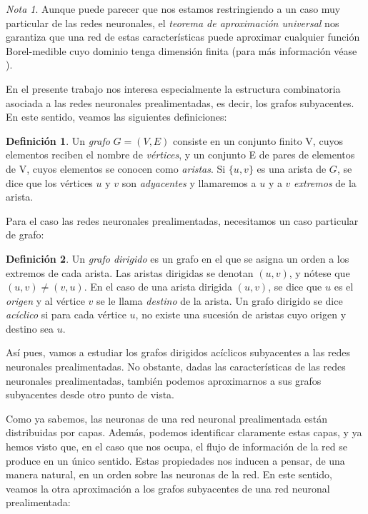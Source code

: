 \documentclass[12pt, a4paper, twoside]{book}
\numberwithin{equation}{section}
\theoremstyle{definition}
\newtheorem{defi}{Definición}[section]
\theoremstyle{remark}
\newtheorem*{remark}{Nota}
\theoremstyle{plain}
\begin{document}
	\begin{remark}
	Aunque puede parecer que nos 
	estamos restringiendo a un caso muy particular de las redes 
	neuronales, el \emph{teorema de aproximación universal} nos garantiza
	que una red de estas características puede aproximar cualquier función
	Borel-medible cuyo dominio tenga dimensión finita (para más 
	información véase \cite{TeoremaAproxUn-Kurt}).
	\end{remark}

	En el presente trabajo nos interesa especialmente la estructura 
	combinatoria asociada a las redes neuronales prealimentadas, es decir, 
	los grafos subyacentes. En este sentido, veamos las siguientes 
	definiciones:

	\begin{defi}
		Un \textit{grafo} $G=(V,E)$ consiste en un conjunto finito V, 
		cuyos 
		elementos reciben el nombre de \textit{vértices}, y un 
		conjunto 
		E de pares de elementos de V, cuyos elementos se conocen como 
		\textit{aristas}. Si $\{u,v\}$ es una arista de $G$, se dice 
		que los vértices $u$ y $v$ son \textit{adyacentes} y 
		llamaremos a $u$ y a $v$ \textit{extremos} de la arista.
	\end{defi}

	Para el caso las redes neuronales prealimentadas, necesitamos un caso 
	particular de grafo:
	
	\begin{defi}
		Un \textit{grafo dirigido} es un grafo en el que se asigna un 
		orden a los extremos de cada arista. Las aristas dirigidas se
		denotan $(u,v)$, y nótese que $(u,v)\neq(v,u)$. En el 
		caso de una arista dirigida $(u,v)$, se dice que $u$ es el 
		\textit{origen} y al vértice $v$ se le llama \textit{destino} 
		de la arista. Un grafo dirigido se dice \textit{acíclico} si 
		para cada vértice $u$, no existe una sucesión de aristas cuyo
		origen y destino sea $u$.
	\end{defi}

	Así pues, vamos a estudiar los grafos dirigidos acíclicos 
	subyacentes a las redes neuronales prealimentadas. No obstante, dadas 
	las características de las redes neuronales prealimentadas, también 
	podemos aproximarnos a sus grafos subyacentes desde otro punto de 
	vista. 

	Como ya sabemos, las neuronas de una red neuronal prealimentada están
	distribuidas por capas. Además, podemos identificar claramente estas 
	capas, y ya hemos visto que, en el caso que nos ocupa, el flujo de 
	información de la red se produce en un único sentido. Estas 
	propiedades nos inducen a pensar, de una manera natural, en un orden 
	sobre las neuronas de la red. 
	En este sentido, veamos la otra aproximación a los grafos subyacentes
	de una red neuronal prealimentada:
\end{document}
